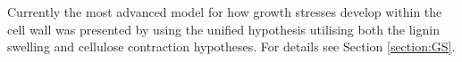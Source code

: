 Currently the most advanced model for how growth stresses develop within the
cell wall was presented by \citet{Alm_ras_2005} using the unified hypothesis
\citep{okuyama1986,Okuyama_1994,yamamoto1991,ISI:A1992HP18200001,Yamamoto_1998} utilising both the lignin swelling and
cellulose contraction hypotheses. For details see Section \ref{section:GS}.
